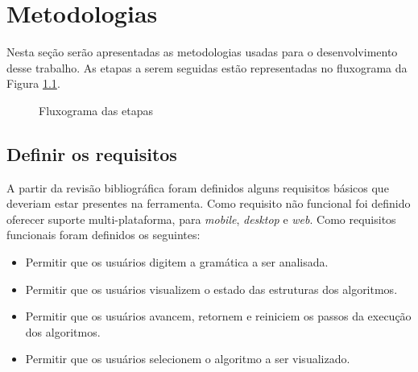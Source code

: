 \chapter{Metodologias}
\label{chap:metodologia}
Nesta seção serão apresentadas as metodologias usadas para o desenvolvimento desse trabalho. As etapas a serem seguidas estão representadas no fluxograma da Figura \ref{fig:etapas}.

\begin{figure}[ht]
  \centering
  \captionsetup{width=16cm}
  \caption{Fluxograma das etapas}
  \label{fig:etapas}
\end{figure}

\section{Definir os requisitos}
A partir da revisão bibliográfica foram definidos alguns requisitos básicos que deveriam estar presentes na ferramenta. Como requisito não funcional foi definido oferecer suporte multi-plataforma, para \textit{mobile}, \textit{desktop} e \textit{web}. Como requisitos funcionais foram definidos os seguintes:
\begin{itemize}[label={$\sbullet$}]
  \item Permitir que os usuários digitem a gramática a ser analisada.
  \item Permitir que os usuários visualizem o estado das estruturas dos algoritmos.
  \item Permitir que os usuários avancem, retornem e reiniciem os passos da execução dos algoritmos.
  \item Permitir que os usuários selecionem o algoritmo a ser visualizado.
\end{itemize}

